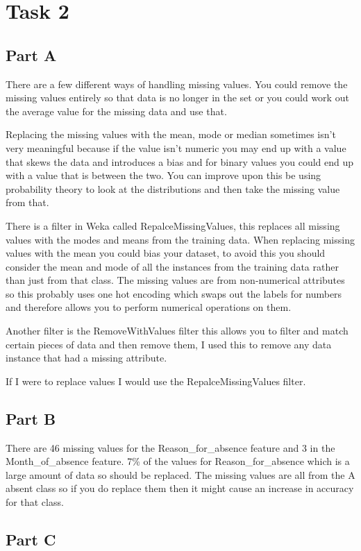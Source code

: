 \documentclass[10pt]{article}
\begin{document}
\section*{Task 2}

\subsection*{Part A}
There are a few different ways of handling missing values. You could remove the missing values entirely so that data is no longer in the set or you could work out the average value for the missing data and use that. 

Replacing the missing values with the mean, mode or median sometimes isn't very meaningful because if the value isn't numeric you may end up with a value that skews the data and introduces a bias and for binary values you could end up with a value that is between the two. You can improve upon this be using probability theory to look at the distributions and then take the missing value from that.

There is a filter in Weka called RepalceMissingValues, this replaces all missing values with the modes and means from the training data. When replacing missing values with the mean you could bias your dataset, to avoid this you should consider the mean and mode of all the instances from the training data rather than just from that class. The missing values are from non-numerical attributes so this probably uses one hot encoding which swaps out the labels for numbers and therefore allows you to perform numerical operations  on them.

Another filter is the RemoveWithValues filter this allows you to filter and match certain pieces of data and then remove them, I used this to remove any data instance that had a missing attribute. 

If I were to replace values I would use the RepalceMissingValues filter.

\subsection*{Part B}
There are 46 missing values for the Reason\_for\_absence feature and 3 in the Month\_of\_absence feature. 7\% of the values for Reason\_for\_absence which is a large amount of data so should be replaced. The missing values are all from the A absent class so if you do replace them then it might cause an increase in accuracy for that class.

\subsection*{Part C}
\end{document}
